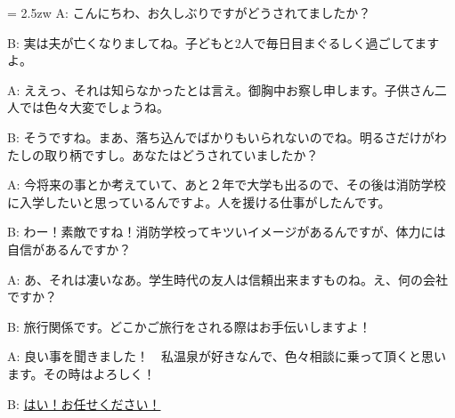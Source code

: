 \documentclass[11pt]{amsart}
\title{}
\author{}
\newenvironment{hangall}[1]{\hangindent = 2.5zw\everypar{\hangindent = 2.5zw}}{}
\begin{document}
\maketitle
\begin{hangall}{}%
A: こんにちわ、お久しぶりですがどうされてましたか？

B: 実は夫が亡くなりましてね。子どもと2人で毎日目まぐるしく過ごしてますよ。

A: ええっ、それは知らなかったとは言え。御胸中お察し申します。子供さん二人では色々大変でしょうね。

B: そうですね。まあ、落ち込んでばかりもいられないのでね。明るさだけがわたしの取り柄ですし。あなたはどうされていましたか？

A: 今将来の事とか考えていて、あと２年で大学も出るので、その後は消防学校に入学したいと思っているんですよ。人を援ける仕事がしたんです。

B: わー！素敵ですね！消防学校ってキツいイメージがあるんですが、体力には自信があるんですか？

A: あ、それは凄いなあ。学生時代の友人は信頼出来ますものね。え、何の会社ですか？

B: 旅行関係です。どこかご旅行をされる際はお手伝いしますよ！

A: 良い事を聞きました！　私温泉が好きなんで、色々相談に乗って頂くと思います。その時はよろしく！

B: \ul{はい！お任せください！}\end{hangall}
\end{document}
